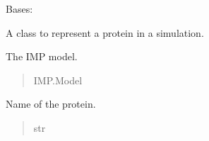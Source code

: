 \documentclass[letterpaper,10pt,english]{sphinxmanual}
\begin{document}
\begin{fulllineitems}
\label{\detokenize{src:src.Protein_Class.Protein}}
\pysigstartsignatures
{}
\pysigstopsignatures
\sphinxAtStartPar
Bases: 

\sphinxAtStartPar
A class to represent a protein in a simulation.

\begin{fulllineitems}
\label{\detokenize{src:src.Protein_Class.Protein.model}}
\pysigstartsignatures
{}
\pysigstopsignatures
\sphinxAtStartPar
The IMP model.
\begin{quote}\begin{description}
\sphinxAtStartPar
IMP.Model

\end{description}\end{quote}

\end{fulllineitems}


\begin{fulllineitems}
\label{\detokenize{src:src.Protein_Class.Protein.name}}
\pysigstartsignatures
{}
\pysigstopsignatures
\sphinxAtStartPar
Name of the protein.
\begin{quote}\begin{description}
\sphinxAtStartPar
str

\end{description}\end{quote}

\end{fulllineitems}



\end{fulllineitems}
\end{document}
